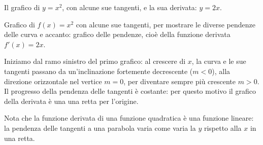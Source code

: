 \begin{inaccessibleblock}
\hspace{-20mm}
\end{inaccessibleblock}
\label{img:diff_parabola_con_pendenze}
\begin{center} Il grafico di \(y=x^2\), con alcune sue tangenti, e 
la sua derivata: \(y=2x\).\end{center}


Grafico di \(f(x)=x^2\) con alcune sue tangenti, per mostrare le 
diverse pendenze delle curva e accanto: grafico delle pendenze, cioè della 
funzione derivata \(f'(x)=2x\).

Iniziamo dal ramo sinistro del primo grafico: al crescere di \(x\), 
la curva e le sue tangenti passano da un'inclinazione fortemente 
decrescente (\(m<0\)), alla direzione orizzontale nel vertice \(m=0\), 
per diventare sempre più crescente \(m>0\).
Il progresso della pendenza delle tangenti è costante: 
per questo motivo il grafico della derivata è una
una retta per l'origine.

\begin{osservazione}
Nota che la funzione derivata di una funzione quadratica è una funzione 
lineare: la pendenza delle tangenti a una parabola varia come varia la \(y\)
rispetto alla \(x\) in una retta.
\end{osservazione}

